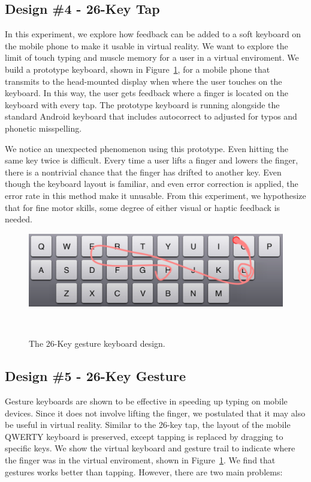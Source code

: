 \subsection{Design \#4 - 26-Key Tap}

In this experiment, we explore how feedback can be added to a soft keyboard on the mobile phone to make it usable in virtual reality.
We want to explore the limit of touch typing and muscle memory for a user in a virtual enviroment.
We build a prototype keyboard, shown in Figure~\ref{fig:gesture}, for a mobile phone that transmits to the head-mounted display when where the user touches on the keyboard.
In this way, the user gets feedback where a finger is located on the keyboard with every tap.
The prototype keyboard is running alongside the standard Android keyboard that includes autocorrect to adjusted for typos and phonetic misspelling.

We notice an unexpected phenomenon using this prototype.
Even hitting the same key twice is difficult.
Every time a user lifts a finger and lowers the finger, there is a nontrivial chance that the finger has drifted to another key.
Even though the keyboard layout is familiar, and even error correction is applied, the error rate in this method make it unusable.
From this experiment, we hypothesize that for fine motor skills, some degree of either visual or haptic feedback is needed.


\begin{figure}[!htb]
  \centering

  \includegraphics[width=1\columnwidth]{figures/gesture}
  
  \caption{The 26-Key gesture keyboard design.}
  ~\label{fig:gesture}
\end{figure}

\subsection{Design \#5 - 26-Key Gesture}


Gesture keyboards are shown to be effective in speeding up typing on mobile devices.
Since it does not involve lifting the finger, we postulated that it may also be useful in virtual reality.
Similar to the 26-key tap, the layout of the mobile QWERTY keyboard is preserved, except tapping is replaced by dragging to specific keys.
We show the virtual keyboard and gesture trail to indicate where the finger was in the virtual enviroment, shown in Figure~\ref{fig:gesture}.
We find that gestures works better than tapping.  However, there are two main problems: 

